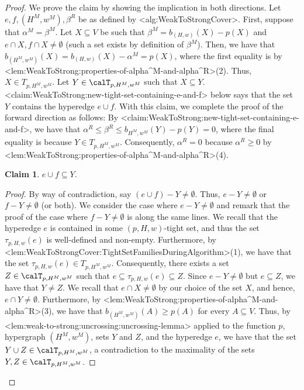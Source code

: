 \documentclass{article}
\def\Cref#1{<#1>}%
\newtheorem{claim}{Claim}[section]
\newcommand{\maximalTightSetFamily}[1]{\ensuremath{\calT_{#1}}\xspace}
\newcommand{\tightSetFamily}[1]{\ensuremath{T_{#1}}\xspace}
\newcommand{\knote}[1]{{\color{red}[{\tiny Karthik: \bf #1}]\marginpar{\color{red}*}}}
\newcommand{\maximalTightSetContainingHyperedge}[1]{\ensuremath{\tau_{#1}}\xspace}
\begin{document}
\begin{proof}
    We prove the claim by showing the implication in both directions. Let $e, f, (H^M, w^M), \beta^R$ be as defined by \Cref{alg:WeakToStrongCover}. 
    First, suppose that $\alpha^M = \beta^M$. Let $X \subseteq V$ be such that $\beta^M = b_{(H,w)}(X) - p(X)$ and $e\cap X, f\cap X \not = \emptyset$ (such a set exists by definition of $\beta^M$). Then, we have that
    $b_{(H^M,w^M)}(X) = b_{(H,w)}(X) - \alpha^M = p(X)$, where the first equality is by \Cref{lem:WeakToStrong:properties-of-alpha^M-and-alpha^R}(2). Thus, $X \in \tightSetFamily{p, H^M, w^M}$. Let $Y \in \maximalTightSetFamily{p, H^M, w^M}$ such that $X \subseteq Y$. \Cref{claim:WeakToStrong:new-tight-set-containing-e-and-f} below says that the set $Y$ contains the hyperedge $e \cup f$. With this claim, we complete the proof of the forward direction as follows: By \Cref{claim:WeakToStrong:new-tight-set-containing-e-and-f}, we have that $\alpha^R \leq \beta^R \leq b_{H^M,w^M}(Y) - p(Y) = 0$, where the final equality is because $Y \in \tightSetFamily{p, H^M, w^M}$. Consequently, $\alpha^R = 0$ because $\alpha^R \geq 0$ by \Cref{lem:WeakToStrong:properties-of-alpha^M-and-alpha^R}(4). 
\begin{claim}\label{claim:WeakToStrong:new-tight-set-containing-e-and-f}
       $e \cup f \subseteq Y$.
    \end{claim}
    \begin{proof}
    By way of contradiction, say $(e\cup f) - Y \not = \emptyset$. Thus, $e - Y \not = \emptyset$ or $f - Y \not = \emptyset$ (or both). We consider the case where $e - Y \not = \emptyset$ and remark that the proof of the case where $f - Y \not = \emptyset$ is along the same lines.
        We recall that the hyperedge $e$ is contained in some $(p, H, w)$-tight set, and thus the set $\maximalTightSetContainingHyperedge{p, H, w}(e)$ is well-defined and non-empty. Furthermore, by \Cref{lem:WeakToStrongCover:TightSetFamiliesDuringAlgorithm}(1), we have that the set $\maximalTightSetContainingHyperedge{p, H, w}(e) \in \tightSetFamily{p, H^M, w^M}$. Consequently, there exists a set $Z \in \maximalTightSetFamily{p, H^M, w^M}$ such that $e \subseteq \maximalTightSetContainingHyperedge{p, H, w}(e) \subseteq Z$. Since $e - Y \not = \emptyset$ but $e \subseteq Z$, we have that $Y \not = Z$.  We recall that $e \cap X \not = \emptyset$ by our choice of the set $X$, and hence, $e \cap Y \not = \emptyset$. Furthermore, by \Cref{lem:WeakToStrong:properties-of-alpha^M-and-alpha^R}(3), we have that $b_{(H^M, w^M)}(A) \geq p(A)$ for every $A \subseteq V$. Thus, by \Cref{lem:weak-to-strong:uncrossing:uncrossing-lemma} applied to the function $p$, hypergraph $(H^M, w^M)$, sets $Y$ and $Z$, and the hyperedge $e$, we have that the set $Y \cup Z \in \maximalTightSetFamily{p, H^M, w^M}$, a contradiction to the maximality of the sets $Y, Z \in \maximalTightSetFamily{p, H^M, w^M}$.
    \end{proof}
    

\end{proof}
\end{document}
